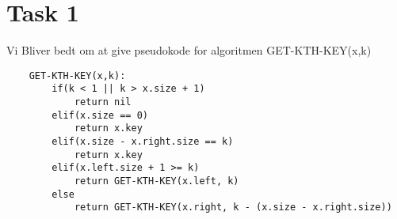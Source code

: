 \section{Task 1}
Vi Bliver bedt om at give pseudokode for algoritmen GET-KTH-KEY(x,k)
\begin{lstlisting}
	GET-KTH-KEY(x,k):
		if(k < 1 || k > x.size + 1)
			return nil
		elif(x.size == 0)
			return x.key
		elif(x.size - x.right.size == k)
			return x.key
		elif(x.left.size + 1 >= k)
			return GET-KTH-KEY(x.left, k)
		else
			return GET-KTH-KEY(x.right, k - (x.size - x.right.size))
\end{lstlisting}


